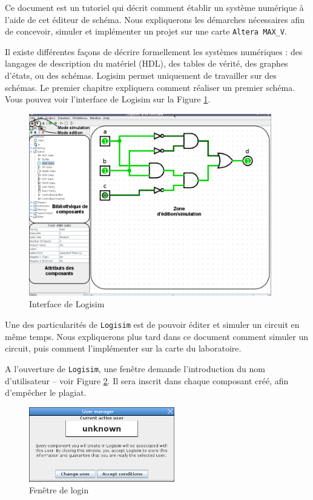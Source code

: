 \documentclass[nosolution]{exercice}
\begin{document}
Ce document est un
tutoriel qui décrit comment établir un système numérique à l'aide de cet éditeur de schéma. Nous expliquerons les
démarches nécessaires afin de concevoir, simuler et implémenter un projet sur une carte \texttt{Altera MAX\_V}.

Il existe différentes façons de décrire formellement les systèmes numériques : des langages de description du matériel
(HDL), des tables de vérité, des graphes d'états, ou des schémas. Logisim permet uniquement de travailler sur des
schémas. Le premier chapitre expliquera comment réaliser un premier schéma.
Vous pouvez voir l'interface de Logisim sur la Figure  \ref{fig_logisim_description}.

\begin{figure}[H]
\begin{center}
\includegraphics[width=300pt]{images/Logisim_description.png}
\caption{\label{fig_logisim_description}Interface de Logisim}
\end{center}
\end{figure}

Une des particularités de \texttt{Logisim} est de pouvoir éditer et simuler un circuit en même temps.
Nous expliquerons plus tard dans ce document comment simuler un circuit, puis comment l'implémenter sur la carte du
laboratoire.

A l'ouverture de \texttt{Logisim}, une fenêtre demande l'introduction du nom d'utilisateur -- voir Figure \ref{fig_logisim_login}.
Il sera inscrit dans chaque composant créé, afin d'empêcher le plagiat.

\begin{figure}[H]
\begin{center}
\includegraphics[width=180pt]{images/login.png}
\caption{\label{fig_logisim_login}Fenêtre de login}
\end{center}
\end{figure}
\end{document}
